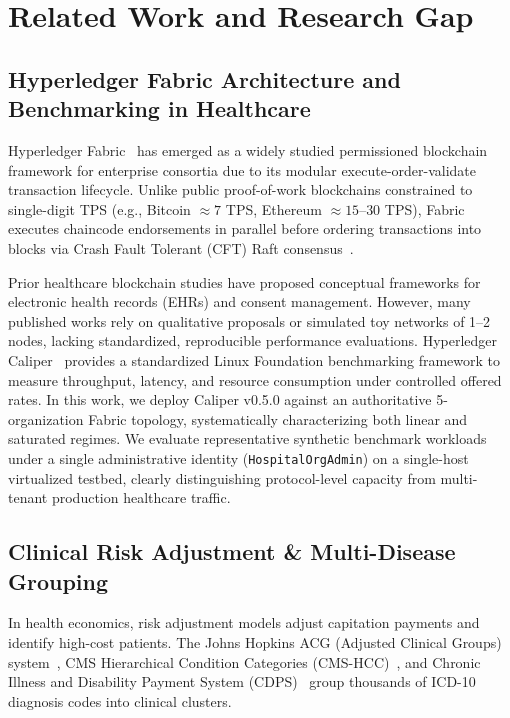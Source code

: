 \documentclass[runningheads]{llncs}
\begin{document}
\section{Related Work and Research Gap}

\subsection{Hyperledger Fabric Architecture and Benchmarking in Healthcare}
Hyperledger Fabric~\cite{androulaki2018hyperledger} has emerged as a widely studied permissioned blockchain framework for enterprise consortia due to its modular execute-order-validate transaction lifecycle. Unlike public proof-of-work blockchains constrained to single-digit TPS (e.g., Bitcoin $\approx 7$ TPS, Ethereum $\approx 15$--$30$ TPS), Fabric executes chaincode endorsements in parallel before ordering transactions into blocks via Crash Fault Tolerant (CFT) Raft consensus~\cite{androulaki2018hyperledger}.

Prior healthcare blockchain studies have proposed conceptual frameworks for electronic health records (EHRs) and consent management. However, many published works rely on qualitative proposals or simulated toy networks of 1--2 nodes, lacking standardized, reproducible performance evaluations. Hyperledger Caliper~\cite{caliper2022} provides a standardized Linux Foundation benchmarking framework to measure throughput, latency, and resource consumption under controlled offered rates. In this work, we deploy Caliper v0.5.0 against an authoritative 5-organization Fabric topology, systematically characterizing both linear and saturated regimes. We evaluate representative synthetic benchmark workloads under a single administrative identity (\texttt{HospitalOrgAdmin}) on a single-host virtualized testbed, clearly distinguishing protocol-level capacity from multi-tenant production healthcare traffic.

\subsection{Clinical Risk Adjustment \& Multi-Disease Grouping}
In health economics, risk adjustment models adjust capitation payments and identify high-cost patients. The Johns Hopkins ACG (Adjusted Clinical Groups) system~\cite{weiner1991development}, CMS Hierarchical Condition Categories (CMS-HCC)~\cite{cms2024report}, and Chronic Illness and Disability Payment System (CDPS)~\cite{kronick2000improving} group thousands of ICD-10 diagnosis codes into clinical clusters.
\end{document}

